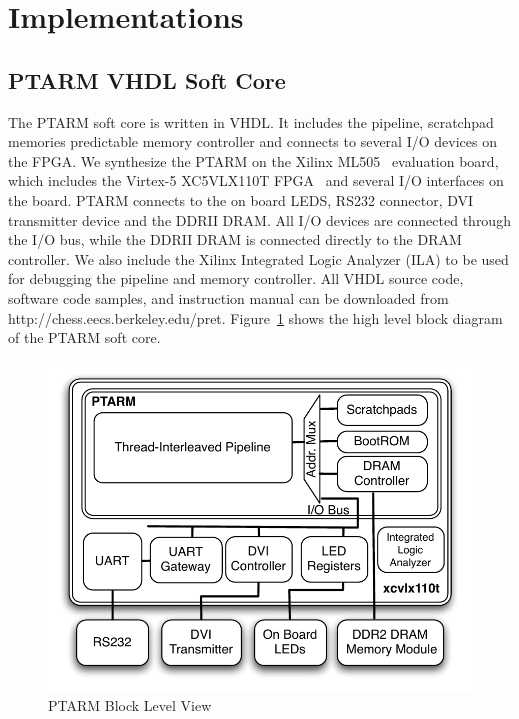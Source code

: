 \section{Implementations}
\subsection{PTARM VHDL Soft Core}
\label{sec:ptarm_vhdl_soft_core}
  
The PTARM soft core is written in VHDL.
It includes the pipeline, scratchpad memories predictable memory controller and connects to several I/O devices on the FPGA.
We synthesize the PTARM on the Xilinx ML505~\cite{xilinx-ml505} evaluation board, which includes the Virtex-5 XC5VLX110T FPGA~\cite{xilinx-v5-overview} and several I/O interfaces on the board. 
PTARM connects to the on board LEDS, RS232 connector, DVI transmitter device and the DDRII DRAM.
All I/O devices are connected through the I/O bus, while the DDRII DRAM is connected directly to the DRAM controller.
We also include the Xilinx Integrated Logic Analyzer (ILA) to be used for debugging the pipeline and memory controller.
All VHDL source code, software code samples, and instruction manual can be downloaded from http://chess.eecs.berkeley.edu/pret.    
Figure~\ref{fig:ptarm_vhdl_high_level} shows the high level block diagram of the PTARM soft core.

\begin{figure}
  \vspace{-20pt}
  \begin{center}
    \includegraphics[scale=.6]{figs/ptarm_vhdl_high_level}
  \end{center}
  \vspace{-3mm}
  \caption{PTARM Block Level View}
  \label{fig:ptarm_vhdl_high_level}
  \vspace{-10pt}
\end{figure} 

